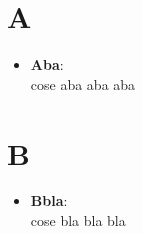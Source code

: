 \documentclass[a4paper, oneside, openany, dvipsnames, table]{article}
\begin{document}
\copertina{} %
\newpage
\tableofcontents
\newpage

\section{A}
\begin{itemize}
\item \textbf{Aba}:\\cose aba aba aba
\end{itemize}


\section{B}
\begin{itemize}
\item \textbf{Bbla}:\\cose bla bla bla
\end{itemize}
\end{document}

